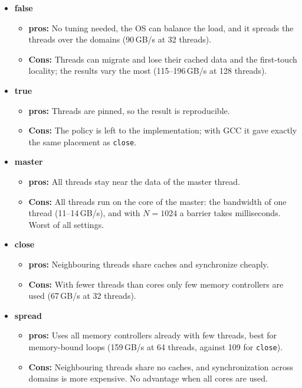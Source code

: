 \documentclass[a4paper,11pt]{article}
\begin{document}
\begin{itemize}
    \item \textbf{false}
        \begin{itemize}
            \item \textbf{pros:} No tuning needed, the OS can balance the load, and it spreads the threads over the domains (90\,GB/s at 32 threads).
            \item \textbf{Cons:} Threads can migrate and lose their cached data and the first-touch locality; the results vary the most (115--196\,GB/s at 128 threads).
        \end{itemize}
    \item \textbf{true}
        \begin{itemize}
            \item \textbf{pros:} Threads are pinned, so the result is reproducible.
            \item \textbf{Cons:} The policy is left to the implementation; with GCC it gave exactly the same placement as \texttt{close}.
        \end{itemize}
    \item \textbf{master}
        \begin{itemize}
            \item \textbf{pros:} All threads stay near the data of the master thread.
            \item \textbf{Cons:} All threads run on the core of the master: the bandwidth of one thread (11--14\,GB/s), and with $N=1024$ a barrier takes milliseconds. Worst of all settings.
        \end{itemize}
    \item \textbf{close}
        \begin{itemize}
            \item \textbf{pros:} Neighbouring threads share caches and synchronize cheaply.
            \item \textbf{Cons:} With fewer threads than cores only few memory controllers are used (67\,GB/s at 32 threads).
        \end{itemize}
    \item \textbf{spread}
        \begin{itemize}
            \item \textbf{pros:} Uses all memory controllers already with few threads, best for memory-bound loops (159\,GB/s at 64 threads, against 109 for \texttt{close}).
            \item \textbf{Cons:} Neighbouring threads share no caches, and synchronization across domains is more expensive. No advantage when all cores are used.
        \end{itemize}
\end{itemize}
\end{document}
